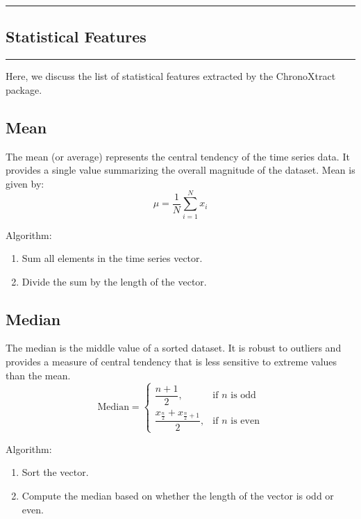 {\color{gray}\hrule}
\begin{center}
\section{Statistical Features}
\bigskip
\end{center}
{\color{gray}\hrule}
Here, we discuss the list of statistical features extracted by the ChronoXtract package. 
\subsection{Mean}
The mean (or average) represents the central tendency of the time series data. It provides a single value summarizing the overall magnitude of the dataset. Mean is given by: 
\begin{equation}
    \mu = \frac{1}{N} \sum_{i=1}^{N} x_i
    \label{eq:mean}
\end{equation}

Algorithm:
\begin{enumerate}
    \item Sum all elements in the time series vector.
    \item Divide the sum by the length of the vector.
\end{enumerate}


\subsection{Median}
The median is the middle value of a sorted dataset. It is robust to outliers and provides a measure of central tendency that is less sensitive to extreme values than the mean.
\begin{equation}
   \text{Median} =
   \begin{cases} 
   \dfrac{n+1}{2}, & \text{if } n \text{ is odd} \\ 
   \dfrac{x_{\frac{n}{2}} + x_{\frac{n}{2} + 1}}{2}, & \text{if } n \text{ is even}
   \end{cases}
   \label{eq:median_expression}
\end{equation}

Algorithm:
\begin{enumerate}
    \item Sort the vector.
    \item Compute the median based on whether the length of the vector is odd or even.
\end{enumerate}

